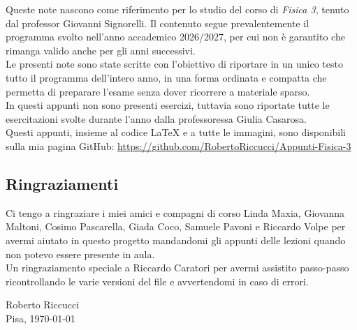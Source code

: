 
Queste note nascono come riferimento per lo studio del corso di \emph{Fisica 3}, tenuto dal professor Giovanni Signorelli. Il contenuto segue prevalentemente il programma svolto nell'anno accademico 2026/2027, per cui non è garantito che rimanga valido anche per gli anni successivi. \\
Le presenti note sono state scritte con l'obiettivo di riportare in un unico testo tutto il programma dell'intero anno, in una forma ordinata e compatta che permetta di preparare l'esame senza dover ricorrere a materiale sparso. \\

In questi appunti non sono presenti esercizi, tuttavia sono riportate tutte le esercitazioni svolte durante l'anno dalla professoressa Giulia Casarosa.\\

Questi appunti, insieme al codice \LaTeX{} e a tutte le immagini, sono disponibili sulla mia pagina GitHub: \url{https://github.com/RobertoRiccucci/Appunti-Fisica-3}

\subsection*{Ringraziamenti}
Ci tengo a ringraziare i miei amici e compagni di corso Linda Maxia, Giovanna Maltoni, Cosimo Pascarella, Giada Coco, Samuele Pavoni e Riccardo Volpe per avermi aiutato in questo progetto mandandomi gli appunti delle lezioni quando non potevo essere presente in aula. \\
Un ringraziamento speciale a Riccardo Caratori per avermi assistito passo-passo ricontrollando le varie versioni del file e avvertendomi in caso di errori.  

\begin{flushright}
Roberto Riccucci\\
Pisa, \today
\end{flushright}
